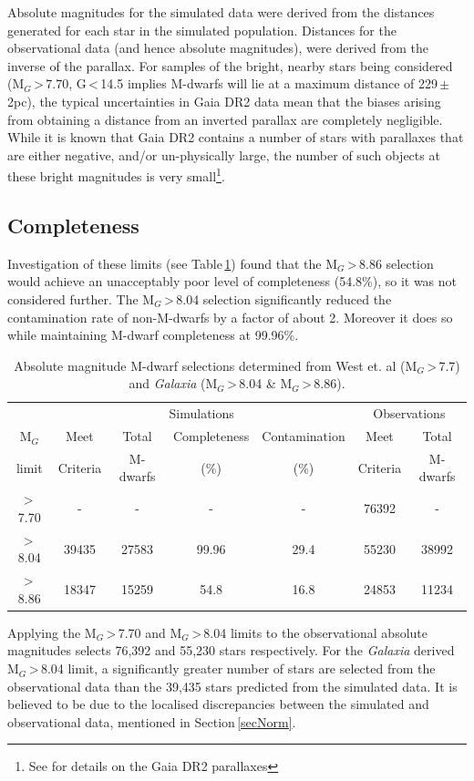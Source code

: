 Absolute magnitudes for the simulated data were derived from the distances generated for each star in the simulated population. Distances for the observational data (and hence absolute magnitudes), were derived from the inverse of the parallax. For samples of the bright, nearby stars being considered (M$_G$\,\textgreater\,7.70, G\,\textless\,14.5 implies M-dwarfs will lie at a maximum distance of 229\,$\pm$\,2pc), the typical uncertainties in Gaia DR2 data mean that the biases arising from obtaining a distance from an inverted parallax are completely negligible. While it is known that Gaia DR2 contains a number of stars with parallaxes that are either negative, and/or un-physically large, the number of such objects at these bright magnitudes is very small\footnote{See \citealt{2018Luri} for details on the Gaia DR2 parallaxes}.
\subsection{Completeness}
Investigation of these limits (see Table\,\ref{tabAbs}) found that the M$_G$\,\textgreater\,8.86 selection would achieve an unacceptably poor level of completeness (54.8\%), so it was not considered further. The M$_G$\,\textgreater\,8.04 selection significantly reduced the contamination rate of non-M-dwarfs by a factor of about 2. Moreover it does so while maintaining M-dwarf completeness at 99.96\%.\\

\begin{table}
\hspace{-5mm}
	\begin{tabular}{ | c | c c c c | c c |} 
		\hline
        & \multicolumn{4}{c|}{Simulations} & \multicolumn{2}{c|}{Observations}\\
		M$_G$ & Meet & Total & Completeness & Contamination & Meet & Total\\
        limit & Criteria & M-dwarfs & (\%) & (\%) & Criteria & M-dwarfs\\
		\hline
        \textgreater\,7.70 & - & - & - & - & 76392 & -\\
        \textgreater\,8.04 & 39435 & 27583 & 99.96 & 29.4 & 55230 & 38992\\
        \textgreater\,8.86 & 18347 & 15259 & 54.8 & 16.8 & 24853 & 11234\\
		\hline
	\end{tabular}
    \caption{Absolute magnitude M-dwarf selections determined from West et. al (M$_G$\,\textgreater\,7.7) and {\em Galaxia} (M$_G$\,\textgreater\,8.04 \& M$_G$\,\textgreater\,8.86).}
    \label{tabAbs}
\end{table}
Applying the M$_G$\,\textgreater\,7.70 and M$_G$\,\textgreater\,8.04 limits to the observational absolute magnitudes selects 76,392 and 55,230 stars respectively. For the {\em Galaxia} derived M$_G$\,\textgreater\,8.04 limit, a significantly greater number of stars are selected from the observational data than the 39,435 stars predicted from the simulated data. It is believed to be due to the localised discrepancies between the simulated and observational data, mentioned in Section\,\ref{secNorm}.\\

